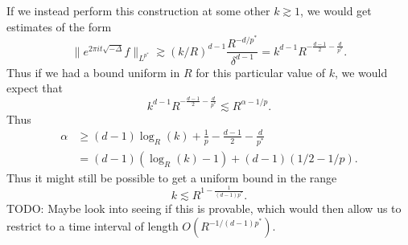 \begin{itemize}
    If we instead perform this construction at some other $k \gtrsim 1$, we would get estimates of the form
    \[ \| e^{2 \pi i t \sqrt{-\Delta}} f \|_{L^{p^*}} \gtrsim (k/R)^{d-1} \frac{R^{-d/p^*}}{\delta^{d-1}} = k^{d-1} R^{-\frac{d-1}{2} - \frac{d}{p^*} }. \]
    Thus if we had a bound uniform in $R$ for this particular value of $k$, we would expect that
    \[ k^{d-1} R^{- \frac{d-1}{2} - \frac{d}{p^*}} \lesssim R^{\alpha - 1/p}. \]
    Thus
    \begin{align*}
        \alpha &\geq (d-1) \log_R(k) + \frac{1}{p} - \frac{d-1}{2} - \frac{d}{p^*}\\
        &= (d-1)(\log_R(k) - 1) + (d-1)(1/2 - 1/p).
    \end{align*}
    Thus it might still be possible to get a uniform bound in the range
    \[ k \lesssim R^{1 - \frac{1}{(d-1) p^*}}. \]
    TODO: Maybe look into seeing if this is provable, which would then allow us to restrict to a time interval of length $O(R^{-1/(d-1) p^*})$.
\end{itemize}

%
%
%
%
%
%

